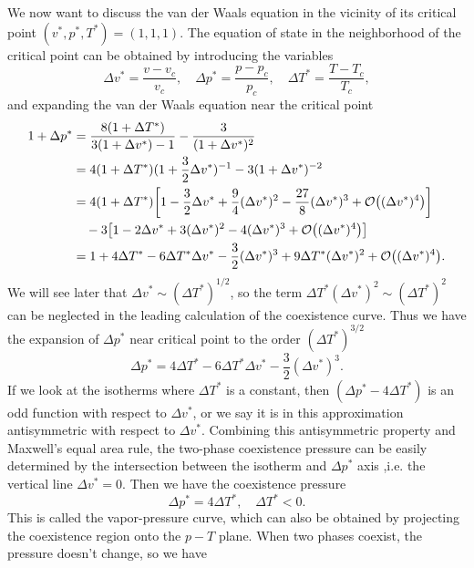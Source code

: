 \documentclass[10pt]{article}
\begin{document}
We now want to discuss the van der Waals equation in the vicinity of its critical point $(v^*, p^*, T^*) = (1, 1, 1)$. The equation of state in the neighborhood of the critical point can be obtained by introducing the variables
\begin{equation}
	\Delta v^* = \frac{v - v_c}{v_c}, \quad \Delta p^* = \frac{p - p_c}{p_c}, \quad \Delta T^* = \frac{T - T_c}{T_c},
\end{equation}
and expanding the van der Waals equation near the critical point
\begin{align*}
	1 + \Delta p^* &= \frac{8(1+\Delta T^*)}{3(1+\Delta v^*) - 1} - \frac{3}{(1+\Delta v^*)^2} \\
	&= 4(1+\Delta T^*)(1 + \frac{3}{2} \Delta v^*)^{-1} - 3(1+\Delta v^*)^{-2} \\
	&= 4(1+\Delta T^*)\qty[1 - \frac{3}{2} \Delta v^* + \frac{9}{4} (\Delta v^*)^2 - \frac{27}{8} (\Delta v^*)^3 + \order{(\Delta v^*)^4}] \\
	&\quad -3\qty[1 - 2\Delta v^* + 3(\Delta v^*)^2 - 4(\Delta v^*)^3 + \order{(\Delta v^*)^4}] \\
	&= 1 + 4\Delta T^* - 6\Delta T^*\Delta v^* - \frac{3}{2}(\Delta v^*)^3 + 9\Delta T^*(\Delta v^*)^2 + \order{(\Delta v^*)^4}.
\end{align*}
We will see later that $\Delta v^* \sim (\Delta T^*)^{1/2}$, so the term $\Delta T^*(\Delta v^*)^2 \sim (\Delta T^*)^{2}$ can be neglected in the leading calculation of the coexistence curve. Thus we have the expansion of $\Delta p^*$ near critical point to the order $(\Delta T^*)^{3/2}$
\begin{equation}
	\Delta p^* = 4 \Delta T^* - 6 \Delta T^* \Delta v^* - \frac{3}{2} (\Delta v^*)^3.
\end{equation}
If we look at the isotherms where $\Delta T^*$ is a constant, then $(\Delta p^* - 4 \Delta T^*)$ is an odd function with respect to $\Delta v^*$, or we say it is in this approximation antisymmetric with respect to $\Delta v^*$. Combining this antisymmetric property and Maxwell's equal area rule, the two-phase coexistence pressure can be easily determined by the intersection between the isotherm and $\Delta p^*$ axis ,i.e. the vertical line $\Delta v^* = 0$. Then we have the coexistence pressure
\begin{equation}
	\Delta p^* = 4 \Delta T^*, \quad \Delta T^* < 0.
\end{equation}
This is called the vapor-pressure curve, which can also be obtained by projecting the coexistence region onto the $p-T$ plane.
When two phases coexist, the pressure doesn't change, so we have
\end{document}
